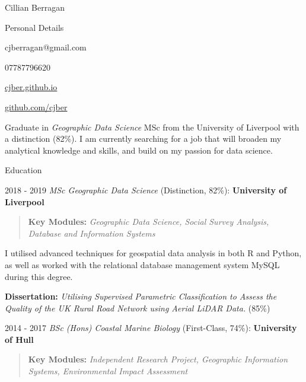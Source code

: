 \documentclass{scrartcl}
\newcommand*\ruleline[1]{\par\noindent\raisebox{.8ex}{\makebox[\linewidth]{\hrulefill\hspace{1ex}\raisebox{-.6ex}{#1}\hspace{1ex}}}}
\newcommand*\rulelinel[1]{\par\noindent\raisebox{.8ex}{\makebox[\linewidth]{\hrulefill\hspace{1ex}\raisebox{-.6ex}{#1}\hspace{1ex}\hrulefill}}}
\begin{document}
\pagestyle{fancy}
\fancyhf{}
\renewcommand{\headrulewidth}{0pt}
\renewcommand{\footrulewidth}{0pt}
\lhead{\rulelinel{\fontsize{9}{9}\bfseries Cillian Berragan \textbullet\ CV}}
\rfoot{\ruleline{\fontsize{9}{9}\bfseries Page \thepage\ of \pageref{LastPage}}}
\setlength{\footskip}{20pt}

\begin{cv}{Cillian Berragan}

\begin{cvlist}{Personal Details}
    \item cjberragan@gmail.com
    \item 07787796620
    \item \href{cjber.github.io}{cjber.github.io}
    \item \href{github.com/cjber}{github.com/cjber}
\end{cvlist}

    \small Graduate in \textit{Geographic Data Science} MSc from the University of Liverpool with a distinction (82\%). I am currently searching for a job that will broaden my analytical knowledge and skills, and build on my passion for data science.

\begin{cvlist}{Education}

\item[2018 - 2019] \normalsize\textit{MSc Geographic Data Science} (Distinction, 82\%): \textbf{University of Liverpool}

    \begin{quote}
        \small\textbf{Key Modules: }\textit{Geographic Data Science, Social Survey Analysis, Database and Information Systems}
    \end{quote}

    \small I utilised advanced techniques for geospatial data analysis in both R and Python, as well as worked with the relational database management system MySQL during this degree.

        \textbf{Dissertation:} \textit{Utilising Supervised Parametric Classification to Assess the Quality of the UK Rural Road Network using Aerial LiDAR Data.} (85\%)


    \item[2014 - 2017] \normalsize\textit{BSc (Hons) Coastal Marine Biology} (First-Class, 74\%): \textbf{University of Hull}

    \begin{quote}
        \small \textbf{Key Modules:} \textit{Independent Research Project, Geographic Information Systems, Environmental Impact Assessment}
    \end{quote}


\end{cvlist}
\end{cv}
\end{document}
